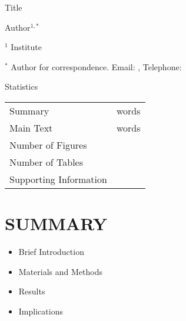 \documentclass[letterpaper,12pt]{article}
\begin{document}
\setlength{\abovedisplayskip}{0pt}
\setlength{\belowdisplayskip}{0pt}




{
\centering
\par \noindent Title
\par \noindent Author$^{1,*}$

\flushleft
\par \noindent $^{1}$ Institute
\par \noindent $^{*}$ Author for correspondence. Email: , Telephone:

%
%
%
%

\begin{center}
\par Statistics

\begin{tabular}{lr}
\hline
Summary					& words\\
Main Text				& words\\
\hline
Number of Figures		&\\
Number of Tables		&\\
Supporting Information	&\\
\hline
\end{tabular}
\end{center}
}




\clearpage
\section*{SUMMARY}
\begin{itemize}[noitemsep,topsep=0pt]
	\item Brief Introduction
	\item Materials and Methods
	\item Results
	\item Implications
\end{itemize}
\end{document}
